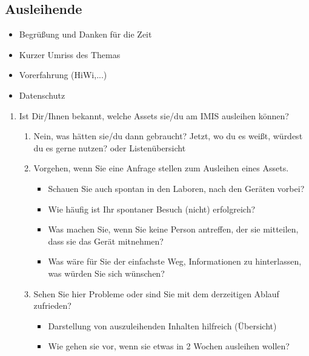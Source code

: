 \subsection{Ausleihende}
\begin{itemize}
    \item Begrüßung und Danken für die Zeit
    \item Kurzer Umriss des Themas
    \item Vorerfahrung (HiWi,...)
    \item Datenschutz
\end{itemize}

{\sffamily\color{maincolor}{Abschnitt: Jetzt}}
\begin{enumerate}
    \item Ist Dir/Ihnen bekannt, welche Assets sie/du am IMIS ausleihen können?
        \begin{enumerate} 
            \item Nein, was hätten sie/du dann gebraucht? Jetzt, wo du es weißt, würdest du es gerne
            nutzen? oder Listenübersicht
            \item Vorgehen, wenn Sie eine Anfrage stellen zum Ausleihen eines Assets.
                \begin{itemize} 
                    \item Schauen Sie auch spontan in den Laboren, nach den Geräten vorbei?
                    \item Wie häufig ist Ihr spontaner Besuch (nicht) erfolgreich?
                    \item Was machen Sie, wenn Sie keine Person antreffen, der sie mitteilen, dass sie das Gerät mitnehmen?
                    \item Was wäre für Sie der einfachste Weg, Informationen zu hinterlassen, was würden Sie sich wünschen?
                \end{itemize}
            \item Sehen Sie hier Probleme oder sind Sie mit dem derzeitigen Ablauf zufrieden?
            \begin{itemize} 
                \item Darstellung von auszuleihenden Inhalten hilfreich (Übersicht)
                \item Wie gehen sie vor, wenn sie etwas in 2 Wochen ausleihen wollen?
            \end{itemize}
        \end{enumerate}
\end{enumerate}

